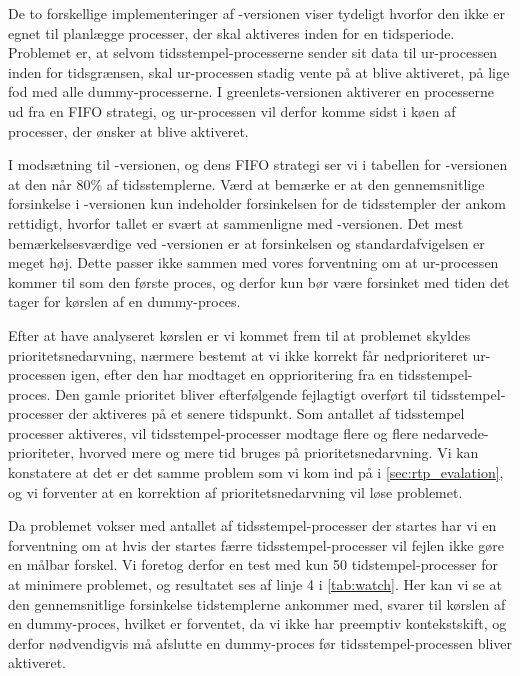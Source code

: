 De to forskellige implementeringer af -versionen viser tydeligt hvorfor den ikke er egnet til planlægge processer, der skal aktiveres inden for en tidsperiode. Problemet er, at selvom tidsstempel-processerne sender sit data til ur-processen inden for tidsgrænsen, skal ur-processen stadig vente på at blive aktiveret, på lige fod med alle dummy-processerne. I greenlets-versionen aktiverer  \sched en processerne ud fra en FIFO strategi, og ur-processen vil derfor komme sidst i køen af processer, der ønsker at blive aktiveret. 

I modsætning til -versionen, og dens FIFO strategi ser vi i tabellen for -versionen at den  når 80\% af tidsstemplerne. Værd at bemærke er at den gennemsnitlige forsinkelse i -versionen kun indeholder forsinkelsen for de tidsstempler der ankom rettidigt, hvorfor tallet er svært at sammenligne med -versionen. Det mest bemærkelsesværdige ved -versionen er at forsinkelsen og standardafvigelsen er meget høj. Dette passer ikke sammen med vores forventning om at ur-processen kommer til som den første proces, og derfor kun bør være forsinket med tiden det tager for kørslen af en  dummy-proces.

Efter at have analyseret kørslen er vi kommet frem til at problemet skyldes prioritetsnedarvning, nærmere bestemt at vi ikke korrekt får nedprioriteret ur-processen igen, efter den har modtaget en opprioritering fra en tidsstempel-proces. Den gamle prioritet bliver efterfølgende fejlagtigt overført til tidsstempel-processer der aktiveres på et senere tidspunkt. Som antallet af tidsstempel processer aktiveres, vil tidsstempel-processer modtage flere og flere nedarvede-prioriteter, hvorved mere og mere tid bruges på prioritetsnedarvning. Vi kan konstatere at det er det samme problem som vi kom ind på i \cref{sec:rtp_evalation}, og vi forventer at en korrektion af prioritetsnedarvning vil løse problemet. 

Da problemet vokser med antallet af tidsstempel-processer der startes har vi en forventning om at hvis der startes færre tidsstempel-processer vil fejlen ikke gøre en målbar forskel. Vi foretog derfor en test med kun 50 tidstempel-processer for at minimere problemet, og resultatet ses af linje 4 i \cref{tab:watch}. Her kan vi se at  den gennemsnitlige forsinkelse tidstemplerne ankommer med, svarer til kørslen af en dummy-proces, hvilket er forventet, da vi ikke har preemptiv kontekstskift, og derfor nødvendigvis må afslutte en dummy-proces før tidsstempel-processen bliver aktiveret. 

